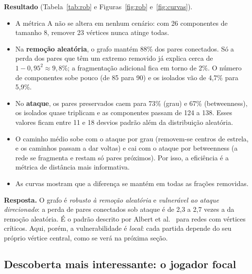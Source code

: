 \documentclass[sigconf]{acmart}
\begin{document}
\textbf{Resultado} (Tabela~\ref{tab:rob} e Figuras~\ref{fig:rob} e~\ref{fig:curvas}).
\begin{itemize}
  \item A métrica A não se altera em nenhum cenário: com 26 componentes de tamanho 8, remover 23
  vértices nunca atinge todas.
  \item Na \textbf{remoção aleatória}, o grafo mantém 88\% dos pares conectados. Só a perda dos
  pares que têm um extremo removido já explica cerca de $1 - 0{,}95^2 \approx 9{,}8\%$; a fragmentação
  adicional fica em torno de 2\%. O número de componentes sobe pouco (de 85 para 90) e os isolados
  vão de 4,7\% para 5,9\%.
  \item No \textbf{ataque}, os pares preservados caem para 73\% (grau) e 67\% (betweenness), os
  isolados quase triplicam e as componentes passam de 124 a 138. Esses valores ficam entre 11 e 18
  desvios padrão além da distribuição aleatória.
  \item O caminho médio sobe com o ataque por grau (removem-se centros de estrela, e os caminhos
  passam a dar voltas) e cai com o ataque por betweenness (a rede se fragmenta e restam só pares
  próximos). Por isso, a eficiência é a métrica de distância mais informativa.
  \item As curvas mostram que a diferença se mantém em todas as frações removidas.
\end{itemize}

\textbf{Resposta.} O grafo é \emph{robusto à remoção aleatória} e \emph{vulnerável ao ataque
direcionado}: a perda de pares conectados sob ataque é de 2,3 a 2,7 vezes a da remoção aleatória. É o padrão descrito por Albert et
al.~\cite{albert2000error} para redes com vértices críticos. Aqui, porém, a vulnerabilidade é
\emph{local}: cada partida depende do seu próprio vértice central, como se verá na próxima seção.

\subsection{Descoberta mais interessante: o jogador focal}
\label{sec:descoberta}
\end{document}
